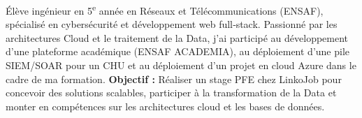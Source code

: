 
\begin{cvparagraph}

    Élève ingénieur en 5\textsuperscript{e} année en Réseaux et Télécommunications (ENSAF), spécialisé en cybersécurité et développement web full‑stack. Passionné par les architectures Cloud et le traitement de la Data, j'ai participé au développement d'une plateforme académique (ENSAF ACADEMIA), au déploiement d'une pile SIEM/SOAR pour un CHU et au déploiement d'un projet en cloud Azure dans le cadre de ma formation.
    \newline
    \textbf{Objectif :} Réaliser un stage PFE chez LinkoJob pour concevoir des solutions scalables, participer à la transformation de la Data et monter en compétences sur les architectures cloud et les bases de données.

\end{cvparagraph}